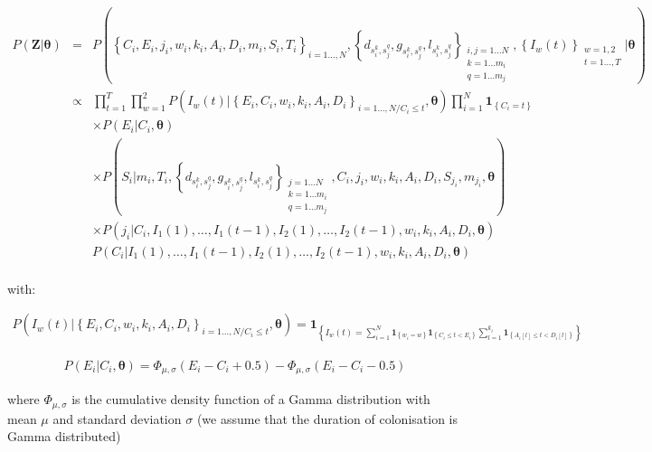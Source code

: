 \documentclass[10pt]{article}
\begin{document}
\begin{eqnarray*}
P\left(\bm{Z}|\bm{\theta}\right) & =  & 
P\left(\left\{C_i,E_i,j_i,w_i,k_i,A_i,D_i,m_i,S_i,T_i\right\}_{i=1\ldots,N},\left\{d_{s_i^k,s_j^q},g_{s_i^k,s_j^q},l_{s_i^k,s_j^q}\right\}_{
\substack{i,j=1\ldots N \\ k=1\ldots m_i \\ q=1\ldots m_j}
}, \left\{I_w\left(t\right)\right\}_{
\substack{w=1,2 \\ t=1\ldots,T}
} |\bm{\theta}\right) \\
& \propto & \bm{\prod}_{t=1}^T \bm{\prod}_{w=1}^2 P\left(I_w\left(t\right)|\left\{E_i,C_i,w_i,k_i,A_i,D_i\right\}_{i=1\ldots,N/C_i\leq t},\bm{\theta}\right) \bm{\prod}_{i=1}^N \mathbf{1}_{\left\lbrace C_i = t \right\rbrace} \\ %
&& \times P\left(E_i|C_i,\bm{\theta}\right) \\
&& \times P\left(S_i|m_i,T_i,\left\{d_{s_i^k,s_j^q},g_{s_i^k,s_j^q},l_{s_i^k,s_j^q}\right\}_{
\substack{j=1\ldots N \\ k=1\ldots m_i \\ q=1\ldots m_j}
},C_i,j_i,w_i,k_i,A_i,D_i,S_{j_i},m_{j_i},\bm{\theta}\right) \\
&& \times P\left(j_i|C_i,I_1\left(1\right),\ldots,I_1\left(t-1\right),I_2\left(1\right),\ldots,I_2\left(t-1\right),w_i,k_i,A_i,D_i,\bm{\theta}\right) \\
&&  P\left(C_i|I_1\left(1\right),\ldots,I_1\left(t-1\right),I_2\left(1\right),\ldots,I_2\left(t-1\right),w_i,k_i,A_i,D_i,\bm{\theta}\right) \\
\end{eqnarray*}

with: 

\begin{eqnarray*}
P\left(I_w\left(t\right)|\left\{E_i,C_i,w_i,k_i,A_i,D_i\right\}_{i=1\ldots,N/C_i\leq t},\bm{\theta}\right) =  \mathbf{1}_{\left\lbrace I_w\left(t\right)=\sum_{i=1}^{N} \mathbf{1}_{\left\lbrace w_i=w \right\rbrace} \mathbf{1}_{\left\lbrace C_i \leq t < E_i \right\rbrace} \sum_{l=1}^{k_i} \mathbf{1}_{\left\lbrace A_i[l] \leq t < D_i[l] \right\rbrace} \right\rbrace}
\end{eqnarray*}

\begin{eqnarray*}
P\left(E_i|C_i,\bm{\theta}\right) = \Phi_{\mu,\sigma}\left(E_i-C_i+0.5\right) - \Phi_{\mu,\sigma}\left(E_i-C_i-0.5\right)
\end{eqnarray*}

\noindent where $\Phi_{\mu,\sigma}$ is the cumulative density function of a Gamma distribution with mean $\mu$ and standard deviation $\sigma$ (we assume that the duration of colonisation is Gamma distributed)
\end{document}
